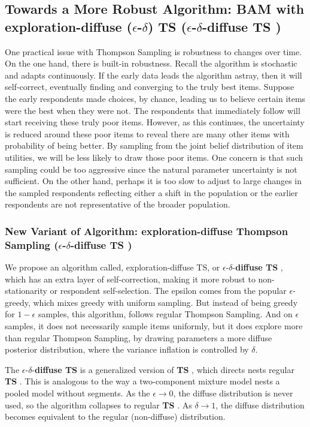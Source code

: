 \documentclass[a4paper,12pt]{article}
\newcommand{\ts}{\textbf{TS} }
\newcommand{\edts}{$\epsilon$-$\delta$-\textbf{diffuse TS} }
\begin{document}
\subsection{Towards a More Robust Algorithm: BAM with exploration-diffuse ($\epsilon$-$\delta$) TS (\edts) }

One practical issue with Thompson Sampling is robustness to changes over time. On the one hand, there is built-in robustness. Recall the algorithm is stochastic and adapts continuously. If the early data leads the algorithm astray, then it will self-correct, eventually finding and converging to the truly best items. Suppose the early respondents made choices, by chance, leading us to believe certain items were the best when they were not. The respondents that immediately follow will start receiving these truly poor items. However, as this continues, the uncertainty is reduced around these poor items to reveal there are many other items with probability of being better. By sampling from the joint belief distribution of item utilities, we will be less likely to draw those poor items. One concern is that such sampling could be too aggressive since the natural parameter uncertainty is not sufficient. On the other hand, perhaps it is too slow to adjust to large changes in the sampled respondents reflecting either a shift in the population or the earlier respondents are not representative of the broader population.


\subsubsection{New Variant of Algorithm: exploration-diffuse Thompson Sampling (\edts)}
We propose an algorithm called, exploration-diffuse TS, or \edts, which has an extra layer of self-correction, making it more robust to non-stationarity or respondent self-selection. The epsilon comes from the popular $\epsilon$-greedy, which mixes greedy with uniform sampling. But instead of being greedy for $1-\epsilon$ samples, this algorithm, follows regular Thompson Sampling. And on $\epsilon$ samples, it does not necessarily sample items uniformly, but it does explore more than regular Thompson Sampling, by drawing parameters a more diffuse posterior distribution, where the variance inflation is controlled by $\delta$.

The \edts is a generalized version of \ts, which directs nests regular \ts. This is analogous to the way a two-component mixture model nests a pooled model without segments. As the $\epsilon \to 0$, the diffuse distribution is never used, so the algorithm collapses to regular \ts. As $\delta \to 1$, the diffuse distribution becomes equivalent to the regular (non-diffuse) distribution. 
\end{document}
